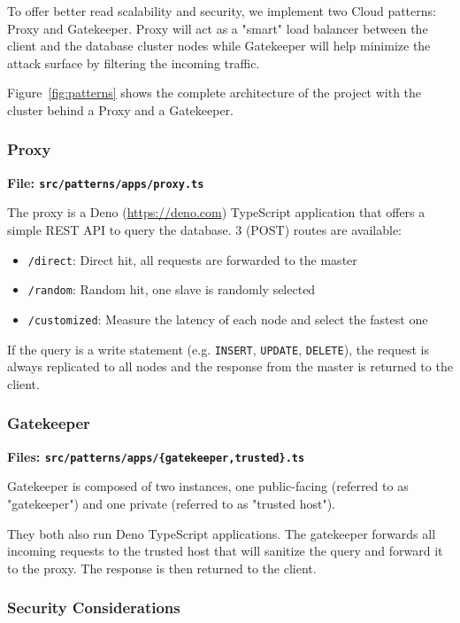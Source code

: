\documentclass[letterpaper,headings=standardclasses,parskip=half]{scrartcl}
\begin{document}
To offer better read scalability and security, we implement two Cloud patterns: Proxy and Gatekeeper. Proxy will act as a "smart" load balancer between the client and the database cluster nodes while Gatekeeper will help minimize the attack surface by filtering the incoming traffic.

Figure~\ref{fig:patterns} shows the complete architecture of the project with the cluster behind a Proxy and a Gatekeeper.

\subsubsection{Proxy}

\textbf{File: \texttt{src/patterns/apps/proxy.ts}}

The proxy is a Deno (\url{https://deno.com}) TypeScript application that offers a simple REST API to query the database. 3 (POST) routes are available:

\begin{itemize}
    \item \texttt{/direct}: Direct hit, all requests are forwarded to the master
    \item \texttt{/random}: Random hit, one slave is randomly selected
    \item \texttt{/customized}: Measure the latency of each node and select the fastest one
\end{itemize}

If the query is a write statement (e.g. \texttt{INSERT}, \texttt{UPDATE}, \texttt{DELETE}), the request is always replicated to all nodes and the response from the master is returned to the client.

\subsubsection{Gatekeeper}

\textbf{Files: \texttt{src/patterns/apps/\{gatekeeper,trusted\}.ts}}

Gatekeeper is composed of two instances, one public-facing (referred to as "gatekeeper") and one private (referred to as "trusted host").

They both also run Deno TypeScript applications. The gatekeeper forwards all incoming requests to the trusted host that will sanitize the query and forward it to the proxy. The response is then returned to the client.

\subsubsection{Security Considerations}
\end{document}
